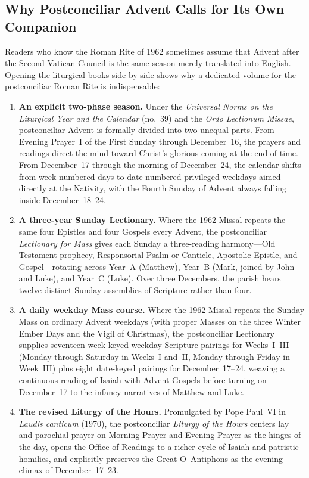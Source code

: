\subsection{Why Postconciliar Advent Calls for Its Own Companion}

Readers who know the Roman Rite of 1962 sometimes assume that Advent after the Second Vatican Council is the same season merely translated into English. Opening the liturgical books side by side shows why a dedicated volume for the postconciliar Roman Rite is indispensable:

\begin{enumerate}
  \item \textbf{An explicit two-phase season.} Under the \textit{Universal Norms on the Liturgical Year and the Calendar} (no.~39) and the \textit{Ordo Lectionum Missae}, postconciliar Advent is formally divided into two unequal parts. From Evening Prayer~I of the First Sunday through December~16, the prayers and readings direct the mind toward Christ's glorious coming at the end of time. From December~17 through the morning of December~24, the calendar shifts from week-numbered days to date-numbered privileged weekdays aimed directly at the Nativity, with the Fourth Sunday of Advent always falling inside December~18--24.
  \item \textbf{A three-year Sunday Lectionary.} Where the 1962 Missal repeats the same four Epistles and four Gospels every Advent, the postconciliar \textit{Lectionary for Mass} gives each Sunday a three-reading harmony---Old Testament prophecy, Responsorial Psalm or Canticle, Apostolic Epistle, and Gospel---rotating across Year~A (Matthew), Year~B (Mark, joined by John and Luke), and Year~C (Luke). Over three Decembers, the parish hears twelve distinct Sunday assemblies of Scripture rather than four.
  \item \textbf{A daily weekday Mass course.} Where the 1962 Missal repeats the Sunday Mass on ordinary Advent weekdays (with proper Masses on the three Winter Ember Days and the Vigil of Christmas), the postconciliar Lectionary supplies seventeen week-keyed weekday Scripture pairings for Weeks~I--III (Monday through Saturday in Weeks~I and~II, Monday through Friday in Week~III) plus eight date-keyed pairings for December~17--24, weaving a continuous reading of Isaiah with Advent Gospels before turning on December~17 to the infancy narratives of Matthew and Luke.
  \item \textbf{The revised Liturgy of the Hours.} Promulgated by Pope Paul~VI in \textit{Laudis canticum} (1970), the postconciliar \textit{Liturgy of the Hours} centers lay and parochial prayer on Morning Prayer and Evening Prayer as the hinges of the day, opens the Office of Readings to a richer cycle of Isaiah and patristic homilies, and explicitly preserves the Great O~Antiphons as the evening climax of December~17--23.

\end{enumerate}
